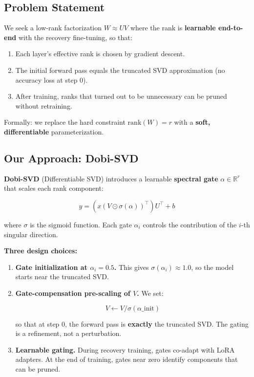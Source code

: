 \subsection{Problem Statement}

We seek a low-rank factorization $W \approx U V$ where the rank is 
\textbf{learnable end-to-end} with the recovery fine-tuning, so that:

\begin{enumerate}
\item Each layer's effective rank is chosen by gradient descent.
\item The initial forward pass equals the truncated SVD approximation
  (no accuracy loss at step 0).
\item After training, ranks that turned out to be unnecessary can be pruned
  without retraining.

\end{enumerate}
Formally: we replace the hard constraint $\text{rank}(W) = r$ with a 
\textbf{soft, differentiable} parameterization.

\subsection{Our Approach: Dobi-SVD}

\textbf{Dobi-SVD} (Differentiable SVD) introduces a learnable \textbf{spectral gate} 
$\alpha \in \mathbb{R}^r$ that scales each rank component:

\[
y = (x (V \odot \sigma(\alpha))^\top) U^\top + b
\tag{1.2}
\]

where $\sigma$ is the sigmoid function. Each gate $\alpha_i$ controls the 
contribution of the $i$-th singular direction.

\textbf{Three design choices:}

\begin{enumerate}
\item \textbf{Gate initialization at $\alpha_i = 0.5$.} This gives
  $\sigma(\alpha_i) \approx 1.0$, so the model starts near
  the truncated SVD.

\item \textbf{Gate-compensation pre-scaling of $V$.} We set:

  $$
  V \leftarrow V / \sigma(\alpha\_\text{init})
  \tag{1.3}
  $$

  so that at step 0, the forward pass is \textbf{exactly} the truncated SVD.
  The gating is a refinement, not a perturbation.

\item \textbf{Learnable gating.} During recovery training, gates co-adapt with LoRA
  adapters. At the end of training, gates near zero identify components
  that can be pruned.

\end{enumerate}
